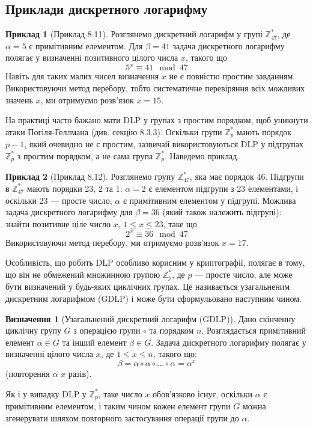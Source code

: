 \documentclass[12pt]{report}
\theoremstyle{definition}
\newtheorem{definition}{Визначення}[chapter]
\newtheorem{example}{Приклад}[chapter]
\theoremstyle{plain}
\begin{document}
\subsection{Приклади дискретного логарифму}

\begin{example}[Приклад 8.11]
Розглянемо дискретний логарифм у групі \( \mathbb{Z}^*_{47} \), де \( \alpha = 5 \) є примітивним елементом. Для \( \beta = 41 \) задача дискретного логарифму полягає у визначенні позитивного цілого числа \( x \), такого що
\[
5^x \equiv 41 \mod 47
\]
Навіть для таких малих чисел визначення \( x \) не є повністю простим завданням. Використовуючи метод перебору, тобто систематичне перевіряння всіх можливих значень \( x \), ми отримуємо розв'язок \( x = 15 \).
\end{example}

На практиці часто бажано мати DLP у групах з простим порядком, щоб уникнути атаки Погіля-Геллмана (див. секцію 8.3.3). Оскільки групи \( \mathbb{Z}^*_p \) мають порядок \( p - 1 \), який очевидно не є простим, зазвичай використовуються DLP у підгрупах \( \mathbb{Z}^*_p \) з простим порядком, а не сама група \( \mathbb{Z}^*_p \). Наведемо приклад.

\begin{example}[Приклад 8.12]
Розглянемо групу \( \mathbb{Z}^*_{47} \), яка має порядок 46. Підгрупи в \( \mathbb{Z}^*_{47} \) мають порядки 23, 2 та 1. \( \alpha = 2 \) є елементом підгрупи з 23 елементами, і оскільки 23 — просте число, \( \alpha \) є примітивним елементом у підгрупі. Можлива задача дискретного логарифму для \( \beta = 36 \) (який також належить підгрупі): знайти позитивне ціле число \( x \), \( 1 \leq x \leq 23 \), таке що
\[
2^x \equiv 36 \mod 47
\]
Використовуючи метод перебору, ми отримуємо розв'язок \( x = 17 \).
\end{example}

Особливість, що робить DLP особливо корисним у криптографії, полягає в тому, що він не обмежений множинною групою \( \mathbb{Z}^*_p \), де \( p \) — просте число, але може бути визначений у будь-яких циклічних групах. Це називається узагальненим дискретним логарифмом (GDLP) і може бути сформульовано наступним чином.

\begin{definition}[Узагальнений дискретний логарифм (GDLP)]
Дано скінченну циклічну групу \( G \) з операцією групи \( \circ \) та порядком \( n \). Розглядається примітивний елемент \( \alpha \in G \) та інший елемент \( \beta \in G \). Задача дискретного логарифму полягає у визначенні цілого числа \( x \), де \( 1 \leq x \leq n \), такого що:
\[
\beta = \alpha \circ \alpha \circ \ldots \circ \alpha = \alpha^x
\]
(повторення \( \alpha \) \( x \) разів).


Як і у випадку DLP у \( \mathbb{Z}^*_p \), таке число \( x \) обов'язково існує, оскільки \( \alpha \) є примітивним елементом, і таким чином кожен елемент групи \( G \) можна згенерувати шляхом повторного застосування операції групи до \( \alpha \).
\end{definition}
\end{document}
